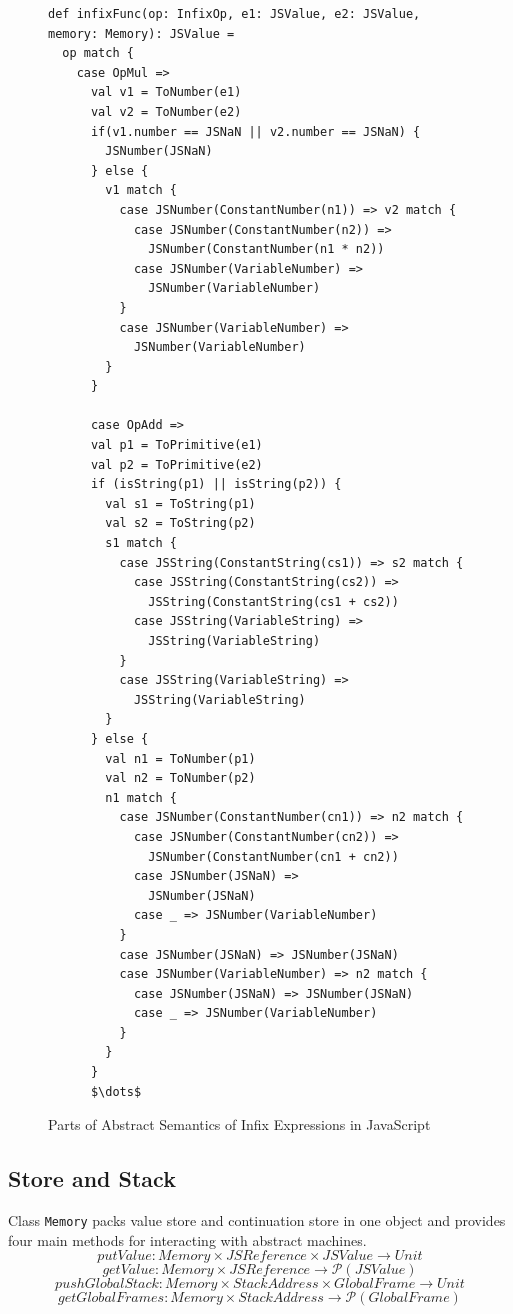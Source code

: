 \documentclass{article}
\begin{document}
\begin{figure}
  \lstset{language=Scala, mathescape}
  \begin{lstlisting}
def infixFunc(op: InfixOp, e1: JSValue, e2: JSValue, memory: Memory): JSValue =
  op match {
    case OpMul =>
      val v1 = ToNumber(e1)
      val v2 = ToNumber(e2)
      if(v1.number == JSNaN || v2.number == JSNaN) {
        JSNumber(JSNaN)
      } else {
        v1 match {
          case JSNumber(ConstantNumber(n1)) => v2 match {
            case JSNumber(ConstantNumber(n2)) =>
              JSNumber(ConstantNumber(n1 * n2))
            case JSNumber(VariableNumber) =>
              JSNumber(VariableNumber)
          }
          case JSNumber(VariableNumber) =>
            JSNumber(VariableNumber)
        }
      }

      case OpAdd =>
      val p1 = ToPrimitive(e1)
      val p2 = ToPrimitive(e2)
      if (isString(p1) || isString(p2)) {
        val s1 = ToString(p1)
        val s2 = ToString(p2)
        s1 match {
          case JSString(ConstantString(cs1)) => s2 match {
            case JSString(ConstantString(cs2)) =>
              JSString(ConstantString(cs1 + cs2))
            case JSString(VariableString) =>
              JSString(VariableString)
          }
          case JSString(VariableString) =>
            JSString(VariableString)
        }
      } else {
        val n1 = ToNumber(p1)
        val n2 = ToNumber(p2)
        n1 match {
          case JSNumber(ConstantNumber(cn1)) => n2 match {
            case JSNumber(ConstantNumber(cn2)) =>
              JSNumber(ConstantNumber(cn1 + cn2))
            case JSNumber(JSNaN) =>
              JSNumber(JSNaN)
            case _ => JSNumber(VariableNumber)
          }
          case JSNumber(JSNaN) => JSNumber(JSNaN)
          case JSNumber(VariableNumber) => n2 match {
            case JSNumber(JSNaN) => JSNumber(JSNaN)
            case _ => JSNumber(VariableNumber)
          }
        }
      }
      $\dots$
  \end{lstlisting}
  \caption{Parts of Abstract Semantics of Infix Expressions in JavaScript}
\label{fig:infix}
\end{figure}

\subsection{Store and Stack}
\label{sub:Store and Stack}

Class \verb|Memory| packs value store and continuation store in one object and provides four main methods for interacting with abstract machines.
\[
putValue: Memory \times JSReference \times JSValue \to Unit
\]
\[
getValue: Memory \times JSReference \to \mathcal{P}(JSValue)
\]
\[
pushGlobalStack: Memory \times StackAddress \times GlobalFrame \to Unit
\]
\[
getGlobalFrames: Memory \times StackAddress \to \mathcal{P}(GlobalFrame)
\]
\end{document}
